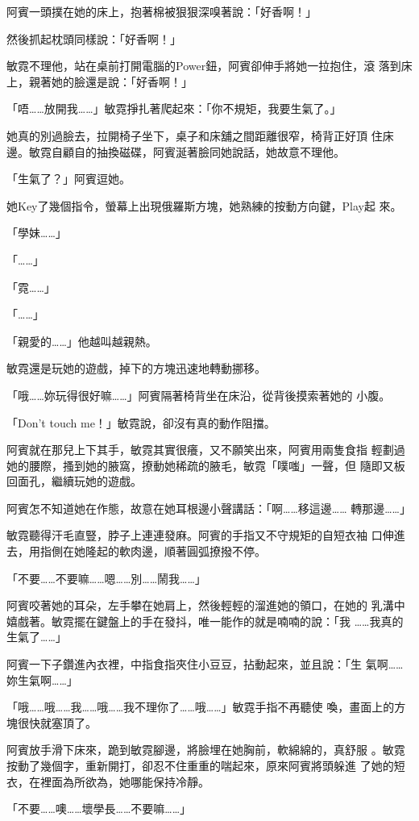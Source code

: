 阿賓一頭撲在她的床上，抱著棉被狠狠深嗅著說：「好香啊！」

然後抓起枕頭同樣說：「好香啊！」

敏霓不理他，站在桌前打開電腦的Power鈕，阿賓卻伸手將她一拉抱住，滾
落到床上，親著她的臉還是說：「好香啊！」

「唔……放開我……」敏霓掙扎著爬起來：「你不規矩，我要生氣了。」

她真的別過臉去，拉開椅子坐下，桌子和床舖之間距離很窄，椅背正好頂
住床邊。敏霓自顧自的抽換磁碟，阿賓涎著臉同她說話，她故意不理他。

「生氣了？」阿賓逗她。

她Key了幾個指令，螢幕上出現俄羅斯方塊，她熟練的按動方向鍵，Play起
來。

「學妹……」

「……」

「霓……」

「……」

「親愛的……」他越叫越親熱。

敏霓還是玩她的遊戲，掉下的方塊迅速地轉動挪移。

「哦……妳玩得很好嘛……」阿賓隔著椅背坐在床沿，從背後摸索著她的
小腹。

「Don't touch me！」敏霓說，卻沒有真的動作阻擋。

阿賓就在那兒上下其手，敏霓其實很癢，又不願笑出來，阿賓用兩隻食指
輕劃過她的腰際，搔到她的腋窩，撩動她稀疏的腋毛，敏霓「噗嗤」一聲，但
隨即又板回面孔，繼續玩她的遊戲。

阿賓怎不知道她在作態，故意在她耳根邊小聲講話：「啊……移這邊……
轉那邊……」

敏霓聽得汗毛直豎，脖子上連連發麻。阿賓的手指又不守規矩的自短衣袖
口伸進去，用指側在她隆起的軟肉邊，順著圓弧撩撥不停。

「不要……不要嘛……嗯……別……鬧我……」

阿賓咬著她的耳朵，左手攀在她肩上，然後輕輕的溜進她的領口，在她的
乳溝中嬉戲著。敏霓擺在鍵盤上的手在發抖，唯一能作的就是喃喃的說：「我
……我真的生氣了……」

阿賓一下子鑽進內衣裡，中指食指夾住小豆豆，拈動起來，並且說：「生
氣啊……妳生氣啊……」

「哦……哦……我……哦……我不理你了……哦……」敏霓手指不再聽使
喚，畫面上的方塊很快就塞頂了。

阿賓放手滑下床來，跪到敏霓腳邊，將臉埋在她胸前，軟綿綿的，真舒服
。敏霓按動了幾個字，重新開打，卻忍不住重重的喘起來，原來阿賓將頭躲進
了她的短衣，在裡面為所欲為，她哪能保持冷靜。

「不要……噢……壞學長……不要嘛……」

